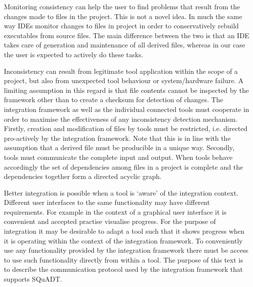 \documentclass{article}
\newcommand{\squadt}{SQuADT\xspace}
\begin{document}
  Monitoring consistency can help the user to find problems that result from
  the changes made to files in the project. This is not a novel idea. In much
  the same way IDEs monitor changes to files in project in order to
  conservatively rebuild executables from source files. The main difference
  between the two is that an IDE takes care of generation and maintenance of
  all derived files, whereas in our case the user is expected to actively do
  these tasks.

  Inconsistency can result from legitimate tool application within the scope of
  a project, but also from unexpected tool behaviour or system/hardware
  failure. A limiting assumption in this regard is that file contents cannot be
  inspected by the framework other than to create a checksum for detection of
  changes.  The integration framework as well as the individual connected tools
  must cooperate in order to maximise the effectiveness of any inconsistency
  detection mechanism.  Firstly, creation and modification of files by tools
  must be restricted, i.e. directed pro-actively by the integration framework.
  Note that this is in line with the assumption that a derived file must be
  producible in a unique way. Secondly, tools must communicate the complete
  input and output.  When tools behave accordingly the set of dependencies
  among files in a project is complete and the dependencies together form a
  directed acyclic graph.
 
  Better integration is possible when a tool is `aware' of the integration
  context.  Different user interfaces to the same functionality may have
  different requirements. For example in the context of a graphical user
  interface it is convenient and accepted practise visualise progress. For the
  purpose of integration it may be desirable to adapt a tool such that it shows
  progress when it is operating within the context of the integration
  framework. To conveniently use any functionality provided by the integration
  framework there must be access to use such functionality directly from within
  a tool.  The purpose of this text is to describe the communication protocol
  used by the integration framework that supports \squadt.

\end{document}
